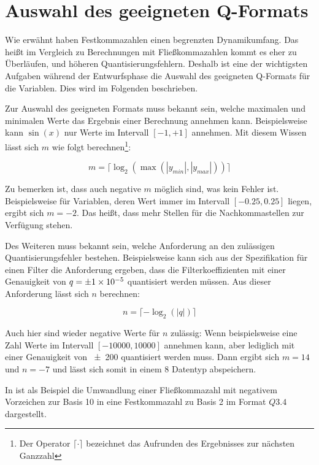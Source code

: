 \section{Auswahl des geeigneten Q-Formats}
Wie erwähnt haben Festkommazahlen einen begrenzten Dynamikumfang. Das heißt im Vergleich zu Berechnungen mit Fließkommazahlen kommt es eher zu Überläufen, und höheren Quantisierungsfehlern. Deshalb ist eine der wichtigsten Aufgaben während der Entwurfsphase die Auswahl des geeigneten Q-Formats für die Variablen. Dies wird im Folgenden beschrieben.

Zur Auswahl des geeigneten Formats muss bekannt sein, welche maximalen und minimalen Werte das Ergebnis einer Berechnung annehmen kann. Beispielsweise kann $\sin(x)$ nur Werte im Intervall $[-1, +1]$ annehmen. Mit diesem Wissen lässt sich $m$ wie folgt berechnen\footnote{Der Operator $\lceil \cdot \rceil$ bezeichnet das Aufrunden des Ergebnisses zur nächsten Ganzzahl}:

\[m=\lceil \log_2(\max(|y_{min}|,|y_{max}|)) \rceil \]

Zu bemerken ist, dass auch negative $m$ möglich sind, was kein Fehler ist. Beispielsweise für Variablen, deren Wert immer im Intervall $[-0.25, 0.25]$ liegen, ergibt sich $m=-2$. Das heißt, dass mehr Stellen für die Nachkommastellen zur Verfügung stehen.

Des Weiteren muss bekannt sein, welche Anforderung an den zulässigen Quantisierungsfehler bestehen. Beispielsweise kann sich aus der Spezifikation für einen Filter die Anforderung ergeben, dass die Filterkoeffizienten mit einer Genauigkeit von $q=\num{\pm1e-5}$ quantisiert werden müssen. Aus dieser Anforderung lässt sich $n$ berechnen:

\[n=\lceil -\log_2(|q|) \rceil \]

Auch hier sind wieder negative Werte für $n$ zulässig: Wenn beispielsweise eine Zahl Werte im Intervall $[-10000, 10000]$ annehmen kann, aber lediglich mit einer Genauigkeit von \num{\pm200} quantisiert werden muss. Dann ergibt sich $m=14$ und $n=-7$ und lässt sich somit in einem \SI{8}{\bit} Datentyp abspeichern.

In  ist als Beispiel die Umwandlung einer Fließkommazahl mit negativem Vorzeichen zur Basis 10 in eine Festkommazahl zu Basis 2 im Format $Q3.4$ dargestellt.


